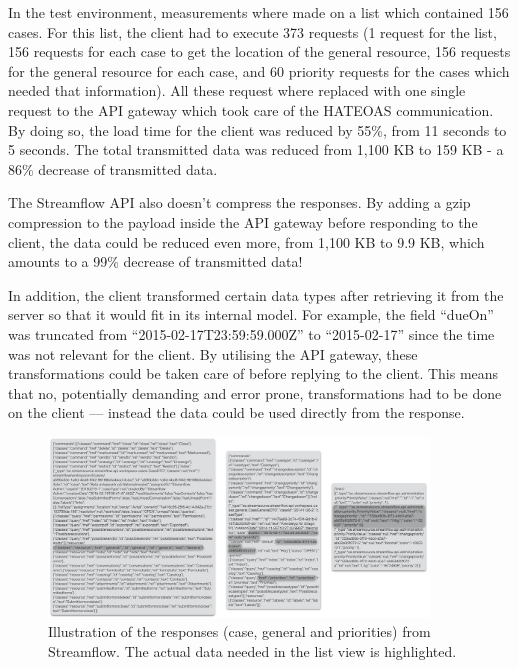 \documentclass{cslthse-msc}
\begin{document}
In the test environment, measurements where made on a list which contained 156 cases. For this list, the client had to execute 373 requests (1 request for the list, 156 requests for each case to get the location of the general resource, 156 requests for the general resource for each case, and 60 priority requests for the cases which needed that information). All these request where replaced with one single request to the API gateway which took care of the HATEOAS communication. By doing so, the load time for the client was reduced by 55\%, from 11 seconds to 5 seconds. The total transmitted data was reduced from 1,100 KB to 159 KB - a 86\% decrease of transmitted data.

The Streamflow API also doesn't compress the responses. By adding a gzip compression to the payload inside the API gateway before responding to the client, the data could be reduced even more, from 1,100 KB to 9.9 KB, which amounts to a 99\% decrease of transmitted data!

In addition, the client transformed certain data types after retrieving it from the server so that it would fit in its internal model. For example, the field \enquote{dueOn} was truncated from \enquote{2015-02-17T23:59:59.000Z} to \enquote{2015-02-17} since the time was not relevant for the client. By utilising the API gateway, these transformations could be taken care of before replying to the client. This means that no, potentially demanding and error prone, transformations had to be done on the client --- instead the data could be used directly from the response.

\begin{figure}[H]
  \centering
    \begin{center}
      \includegraphics[width=0.9\textwidth]{images/streamflow_response.png}
    \end{center}
  \caption{Illustration of the responses (case, general and priorities) from Streamflow. The actual data needed in the list view is highlighted.}
\end{figure}
\end{document}

